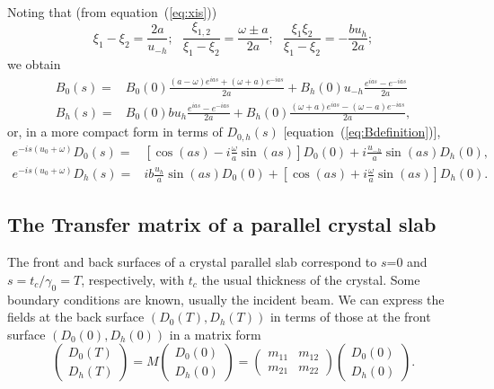 \documentclass[preprint]{iucr}              %
\newcommand{\inblue}[1]{{\color{blue}#1}}
\begin{document}
Noting that (from equation~(\ref{eq:xis}))
\begin{equation}
\label{eq:xiidentities}
\xi_1-\xi_2=\frac{2a}{u_{-h}};~~~
\frac{\xi_{1,2}}{\xi_1-\xi_2}=\frac{\omega \pm a}{2a};~~~
\frac{\xi_1 \xi_2}{\xi_1-\xi_2}=-\frac{b u_h}{2a}; \nonumber
\end{equation}
we obtain
\begin{subequations}
\label{eq:BSolutions}
\begin{align}
B_0(s) = &B_0(0) \frac{(a-\omega) e^{ias} + (\omega+a) e^{-ias}}{2a} + 
    B_h(0) u_{-h} \frac{e^{ias} - e^{-ias}}{2a} \\
B_h(s) = &B_0(0) b u_h \frac{e^{ias} - e^{-ias}}{2a} + 
    B_h(0) \frac{(\omega+a) e^{ias} - (\omega-a) e^{-ias}}{2a},
\end{align}
\end{subequations}
or, in a more compact form \inblue{in terms of $D_{0,h}(s)$ [equation~(\ref{eq:Bdefinition})],}
\begin{subequations}
\label{eq:DSolutionsCompact}
\begin{align}
e^{-is(u_0+\omega)} D_0(s) = & [\cos(as) - i\frac{\omega}{a}\sin(as)] D_0(0) +     i \frac{u_{-h}}{a}\sin(as) D_h(0), \\
e^{-is(u_0+\omega)} D_h(s) = & i b \frac{u_h}{a} \sin(as) D_0(0) + 
    [\cos(as) + i \frac{\omega}{a} \sin(as)] D_h(0).
\end{align}
\end{subequations}

\subsection{The Transfer matrix of a parallel crystal slab}
\label{sec:transferMatrix}

The front and back surfaces of a crystal parallel slab correspond to $s$=0 and $s=t_c/\gamma_0=T$, respectively, with $t_c$ the usual thickness of the crystal. Some boundary conditions are known, usually the incident beam.   
We can express the fields at the back surface $(D_0(T),D_h(T))$ in terms of those at the front surface $(D_0(0),D_h(0))$ in a matrix form
\begin{equation}\label{eq:Mtransfer}
    \begin{pmatrix}
    D_0(T)\\
    D_h(T)
    \end{pmatrix}
    =
    M
        \begin{pmatrix}
    D_0(0) \\
    D_h(0)
    \end{pmatrix}
    =
    \begin{pmatrix}
    m_{11} & m_{12}\\
    m_{21} & m_{22}
    \end{pmatrix}
    \begin{pmatrix}
    D_0(0) \\
    D_h(0)
    \end{pmatrix}.
\end{equation}
\end{document}
